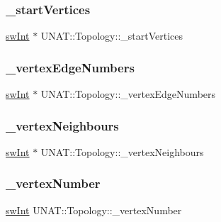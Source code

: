 \subsubsection{\texorpdfstring{\_startVertices}{\_startVertices}}
{\footnotesize\ttfamily \mbox{\hyperlink{include_2swMacro_8h_a113cf5f6b5377cdf3fac6aa4e443e9aa}{sw\+Int}} $\ast$ U\+N\+A\+T\+::\+Topology\+::\+\_\+start\+Vertices\hspace{0.3cm}{\ttfamily [private]}}

\mbox{\label{classUNAT_1_1Topology_abe64506d6d8cde328f20550f26ed6dd4}} 
\subsubsection{\texorpdfstring{\_vertexEdgeNumbers}{\_vertexEdgeNumbers}}
{\footnotesize\ttfamily \mbox{\hyperlink{include_2swMacro_8h_a113cf5f6b5377cdf3fac6aa4e443e9aa}{sw\+Int}} $\ast$ U\+N\+A\+T\+::\+Topology\+::\+\_\+vertex\+Edge\+Numbers\hspace{0.3cm}{\ttfamily [private]}}

\mbox{\label{classUNAT_1_1Topology_a3636340e79a3141d1f63c069cafce816}} 
\subsubsection{\texorpdfstring{\_vertexNeighbours}{\_vertexNeighbours}}
{\footnotesize\ttfamily \mbox{\hyperlink{include_2swMacro_8h_a113cf5f6b5377cdf3fac6aa4e443e9aa}{sw\+Int}} $\ast$ U\+N\+A\+T\+::\+Topology\+::\+\_\+vertex\+Neighbours\hspace{0.3cm}{\ttfamily [private]}}

\mbox{\label{classUNAT_1_1Topology_a48015f5827d8afbf07631314c7b4c961}} 
\subsubsection{\texorpdfstring{\_vertexNumber}{\_vertexNumber}}
{\footnotesize\ttfamily \mbox{\hyperlink{include_2swMacro_8h_a113cf5f6b5377cdf3fac6aa4e443e9aa}{sw\+Int}} U\+N\+A\+T\+::\+Topology\+::\+\_\+vertex\+Number\hspace{0.3cm}{\ttfamily [private]}}

